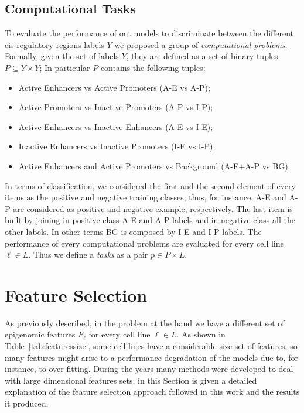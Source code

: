 \subsection{Computational Tasks}
To evaluate the performance of out models to discriminate between the different cis-regulatory regions labels $Y$ we proposed a group of \emph{computational problems}. Formally, given the set of labels $Y$, they are defined as a set of binary tuples $P \subseteq Y \times Y$; In particular $P$ contains the following tuples: 
\begin{itemize}
    \item Active Enhancers vs Active Promoters (A-E vs A-P);
    \item Active Promoters vs Inactive Promoters (A-P vs I-P);
    \item Active Enhancers vs Inactive Enhancers (A-E vs I-E); 
    \item Inactive Enhancers vs Inactive Promoters (I-E vs I-P); 
    \item Active Enhancers and Active Promoters vs Background (A-E+A-P vs BG).
\end{itemize}
In terms of classification, we considered the first and the second element of every items as the positive and negative training classes; thus, for instance, A-E and A-P are considered as positive and negative example, respectively. The last item is built by joining in positive class A-E and A-P labels and in negative class all the other labels. In other terms BG is composed by I-E and I-P labels. The performance of every computational problems are evaluated for every cell line $\ell \in L$. Thus we define a \emph{tasks} as a pair $p \in P \times L$. 

\section{Feature Selection} \label{sec:featureselection}
As previously described, in the problem at the hand we have a different set of epigenomic features $F_\ell$ for every cell line $\ell \in L$. As shown in Table~\ref{tab:featuressize}, some cell lines have a considerable size set of features, so many features might arise to a performance degradation of the models due to, for instance, to over-fitting. During the years many methods were developed to deal with large dimensional features sets, in this Section is given a detailed explanation of the feature selection approach followed in this work and the results it produced. 

